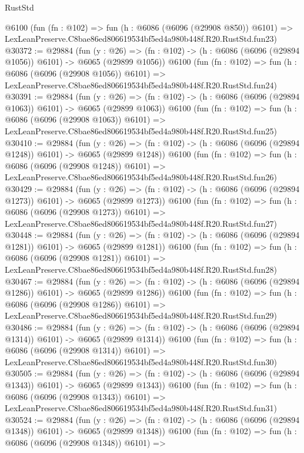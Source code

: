 \begin{lexlean}{RustStd}
\begin{coremodule}
    @6100
    (fun (fn : @102) =>
    fun (h : @6086 (@6096 (@29908 @850)) @6101) =>
    LexLeanPreserve.C8bae86ed806619534bf5ed4a980b448f.R20.RustStd.fun23)
@30372 := @29884
    (fun (y : @26) =>
    (fn : @102) -> (h : @6086 (@6096 (@29894 @1056)) @6101) -> @6065 (@29899 @1056))
    @6100
    (fun (fn : @102) =>
    fun (h : @6086 (@6096 (@29908 @1056)) @6101) =>
    LexLeanPreserve.C8bae86ed806619534bf5ed4a980b448f.R20.RustStd.fun24)
@30391 := @29884
    (fun (y : @26) =>
    (fn : @102) -> (h : @6086 (@6096 (@29894 @1063)) @6101) -> @6065 (@29899 @1063))
    @6100
    (fun (fn : @102) =>
    fun (h : @6086 (@6096 (@29908 @1063)) @6101) =>
    LexLeanPreserve.C8bae86ed806619534bf5ed4a980b448f.R20.RustStd.fun25)
@30410 := @29884
    (fun (y : @26) =>
    (fn : @102) -> (h : @6086 (@6096 (@29894 @1248)) @6101) -> @6065 (@29899 @1248))
    @6100
    (fun (fn : @102) =>
    fun (h : @6086 (@6096 (@29908 @1248)) @6101) =>
    LexLeanPreserve.C8bae86ed806619534bf5ed4a980b448f.R20.RustStd.fun26)
@30429 := @29884
    (fun (y : @26) =>
    (fn : @102) -> (h : @6086 (@6096 (@29894 @1273)) @6101) -> @6065 (@29899 @1273))
    @6100
    (fun (fn : @102) =>
    fun (h : @6086 (@6096 (@29908 @1273)) @6101) =>
    LexLeanPreserve.C8bae86ed806619534bf5ed4a980b448f.R20.RustStd.fun27)
@30448 := @29884
    (fun (y : @26) =>
    (fn : @102) -> (h : @6086 (@6096 (@29894 @1281)) @6101) -> @6065 (@29899 @1281))
    @6100
    (fun (fn : @102) =>
    fun (h : @6086 (@6096 (@29908 @1281)) @6101) =>
    LexLeanPreserve.C8bae86ed806619534bf5ed4a980b448f.R20.RustStd.fun28)
@30467 := @29884
    (fun (y : @26) =>
    (fn : @102) -> (h : @6086 (@6096 (@29894 @1286)) @6101) -> @6065 (@29899 @1286))
    @6100
    (fun (fn : @102) =>
    fun (h : @6086 (@6096 (@29908 @1286)) @6101) =>
    LexLeanPreserve.C8bae86ed806619534bf5ed4a980b448f.R20.RustStd.fun29)
@30486 := @29884
    (fun (y : @26) =>
    (fn : @102) -> (h : @6086 (@6096 (@29894 @1314)) @6101) -> @6065 (@29899 @1314))
    @6100
    (fun (fn : @102) =>
    fun (h : @6086 (@6096 (@29908 @1314)) @6101) =>
    LexLeanPreserve.C8bae86ed806619534bf5ed4a980b448f.R20.RustStd.fun30)
@30505 := @29884
    (fun (y : @26) =>
    (fn : @102) -> (h : @6086 (@6096 (@29894 @1343)) @6101) -> @6065 (@29899 @1343))
    @6100
    (fun (fn : @102) =>
    fun (h : @6086 (@6096 (@29908 @1343)) @6101) =>
    LexLeanPreserve.C8bae86ed806619534bf5ed4a980b448f.R20.RustStd.fun31)
@30524 := @29884
    (fun (y : @26) =>
    (fn : @102) -> (h : @6086 (@6096 (@29894 @1348)) @6101) -> @6065 (@29899 @1348))
    @6100
    (fun (fn : @102) =>
    fun (h : @6086 (@6096 (@29908 @1348)) @6101) =>

\end{coremodule}
\end{lexlean}
